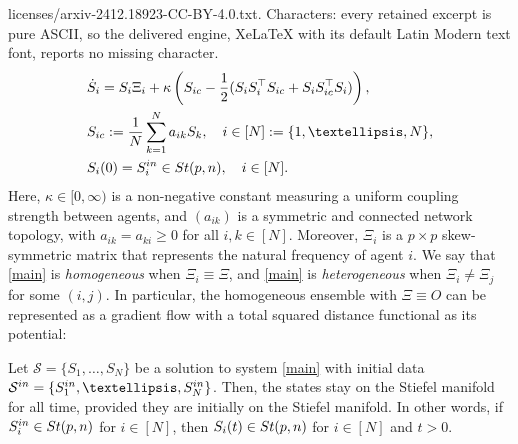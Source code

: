 \documentclass[10pt,a4paper]{amsart}
\newcommand{\St}{  {\textup{St}}(p,n) }
\newcommand{\init}{  {\textup{in}} }
\begin{document}
licenses/arxiv-2412.18923-CC-BY-4.0.txt. Characters: every retained excerpt is pure ASCII, so the delivered engine, XeLaTeX with its default Latin Modern text font, reports no missing character.
\begin{equation} \label{main}
\begin{aligned}
&\dot S_i = S_i \Xi_i + \kappa \left( S_{ic} - \frac12( S_iS_i^\top S_{ic} + S_i S_{ic}^\top S_i) \right),\\
&S_{ic} :=\frac{1}{N}\sum_{k=1}^Na_{ik}S_k,\quad i\in [N]:=\{1,\ldots,N\},\\
&S_{i}(0)=S_i^\init \in \St,\quad i\in [N].
\end{aligned}
\end{equation} Here, $\kappa \in [0, \infty)$ is a non-negative constant measuring a uniform coupling strength between agents, and $(a_{ik})$ is a symmetric and connected network topology, with $a_{ik} = a_{ki}\geq 0$ for all $i,k\in [N]$. Moreover, $\Xi_i$ is a $p \times p$ skew-symmetric matrix that represents the natural frequency of agent $i$. We say that \eqref{main} is \textit{homogeneous} when $\Xi_i \equiv \Xi$, and \eqref{main} is \textit{heterogeneous} when $\Xi_i \neq \Xi_j$ for some $(i, j)$. In particular, the homogeneous ensemble with $\Xi\equiv O$ can be represented as a gradient flow with a total squared distance functional as its potential:

\begin{lemma} \label{L2.1}
Let $\mathcal S = \{S_1,\ldots,S_N\}$ be a solution to system \eqref{main} with initial data $\mathcal S^\init =\{S_1^\init, \ldots, S_N^\init\}$. Then, the states stay on the Stiefel manifold for all time, provided they are initially on the Stiefel manifold. In other words, if $S_i^\init \in \St$ for $i\in [N]$, then $S_i(t) \in \St$ for $i\in [N]$ and $t>0$.
\end{lemma}
\end{document}

